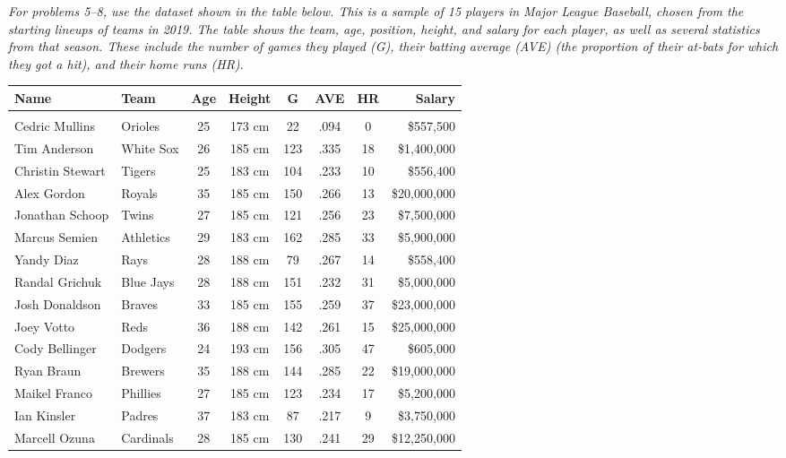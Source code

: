 \begin{exercises}


\emph{For problems 5--8, use the dataset shown in the table below.  This is a sample of 15 players in Major League Baseball, chosen from the starting lineups of teams in 2019.  The table shows the team, age, position, height, and salary for each player, as well as several statistics from that season.  These include the number of games they played (G), their batting average (AVE) (the proportion of their at-bats for which they got a hit), and their home runs (HR).}
\begin{center}
{%
\begin{tabular}{l l c c c c c r}
\textbf{Name} & \textbf{Team} & \textbf{Age} & \textbf{Height} & \textbf{G} & \textbf{AVE} & \textbf{HR} & \textbf{Salary}\\
\hline
& & & & & & & \\
Cedric Mullins & Orioles & 25 & 173 cm & 22 & .094 & 0 & \$557,500\\
Tim Anderson & White Sox & 26 & 185 cm & 123 & .335 & 18 & \$1,400,000\\
Christin Stewart & Tigers & 25 & 183 cm & 104 & .233 & 10 & \$556,400\\
Alex Gordon & Royals & 35 & 185 cm & 150 & .266 & 13 & \$20,000,000\\
Jonathan Schoop & Twins & 27 & 185 cm & 121 & .256 & 23 & \$7,500,000\\
Marcus Semien & Athletics & 29 & 183 cm & 162 & .285 & 33 & \$5,900,000\\
Yandy Diaz & Rays & 28 & 188 cm & 79 & .267 & 14 & \$558,400\\
Randal Grichuk & Blue Jays & 28 & 188 cm & 151 & .232 & 31 & \$5,000,000\\
Josh Donaldson & Braves & 33 & 185 cm & 155 & .259 & 37 & \$23,000,000\\
Joey Votto & Reds & 36 & 188 cm & 142 & .261 & 15 & \$25,000,000\\
Cody Bellinger & Dodgers & 24 & 193 cm & 156 & .305 & 47 & \$605,000\\
Ryan Braun & Brewers & 35 & 188 cm & 144 & .285 & 22 & \$19,000,000\\
Maikel Franco & Phillies & 27 & 185 cm & 123 & .234 & 17 & \$5,200,000\\
Ian Kinsler & Padres & 37 & 183 cm & 87 & .217 & 9 & \$3,750,000\\
Marcell Ozuna & Cardinals & 28 & 185 cm & 130 & .241 & 29 & \$12,250,000\\
\end{tabular}}
\end{center}


\end{exercises}
